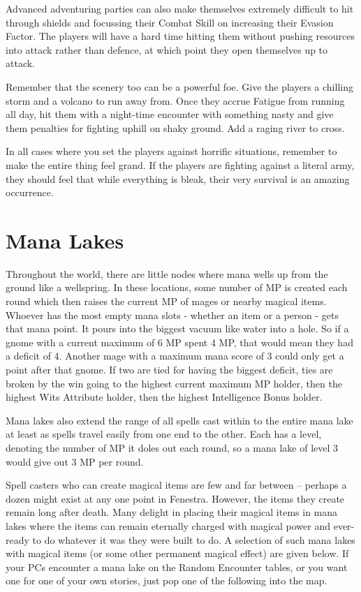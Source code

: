 Advanced adventuring parties can also make themselves extremely difficult to hit through shields and focussing their Combat Skill on increasing their Evasion Factor.  The players will have a hard time hitting them without pushing resources into attack rather than defence, at which point they open themselves up to attack.

Remember that the scenery too can be a powerful foe.  Give the players a chilling storm and a volcano to run away from.  Once they accrue Fatigue from running all day, hit them with a night-time encounter with something nasty and give them penalties for fighting uphill on shaky ground.  Add a raging river to cross.

In all cases where you set the players against horrific situations, remember to make the entire thing feel grand.  If the players are fighting against a literal army, they should feel that while everything is bleak, their very survival is an amazing occurrence.

\section{Mana Lakes}\label{mana_lake}

Throughout the world, there are little nodes where mana wells up from the ground like a wellspring.  In these locations, some number of MP is created each round which then raises the current MP of mages or nearby magical items.  Whoever has the most empty mana slots - whether an item or a person - gets that mana point.  It pours into the biggest vacuum like water into a hole.  So if a gnome with a current maximum of 6 MP spent 4 MP, that would mean they had a deficit of 4.  Another mage with a maximum mana score of 3 could only get a point after that gnome.  If two are tied for having the biggest deficit, ties are broken by the win going to the highest current maximum MP holder, then the highest Wits Attribute holder, then the highest Intelligence Bonus holder.

Mana lakes also extend the range of all spells cast within to the entire mana lake at least as spells travel easily from one end to the other.  Each has a level, denoting the number of MP it doles out each round, so a mana lake of level 3 would give out 3 MP per round.

Spell casters who can create magical items are few and far between -- perhaps a dozen might exist at any one point in Fenestra.  However, the items they create remain long after death.  Many delight in placing their magical items in mana lakes where the items can remain eternally charged with magical power and ever-ready to do whatever it was they were built to do.  A selection of such mana lakes with magical items (or some other permanent magical effect) are given below.  If your PCs encounter a mana lake on the Random Encounter tables, or you want one for one of your own stories, just pop one of the following into the map.

